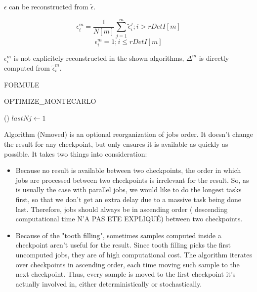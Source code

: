 \documentclass[./thesis.tex]{subfiles}
\begin{document}
$\epsilon$ can be reconstructed from $\tilde \epsilon$.



$$\epsilon^m_i = \frac{1}{N[m]} \sum_{j=1}^{m} {\tilde \epsilon^j_i} ; i > rDetI[m]$$
$$\epsilon^m_i = 1; i \leq rDetI[m]$$


$\epsilon^m_i$ is not explicitely reconstructed in the shown algorithms, $\Delta^m$ is directly computed from $\tilde \epsilon^m_i$.

FORMULE


\begin{algorithm}
	\caption{OPTIMIZE\_MONTECARLO}
	\label{OPTIMIZE_MONTECARLO}
	
	
	\Fn(){}{
		$lastNj \gets 1$ \;
	}
\end{algorithm}

Algorithm (Nmoved) is an optional reorganization of jobs order. It doesn't change the result for any checkpoint, but only ensures it is available as quickly as possible. It takes two things into consideration:
\begin{itemize}
\item
Because no result is available between two checkpoints, the order in which jobs are processed between two checkpoints is irrelevant for the result. So, as is usually the case with parallel jobs, we would like to do the longest tasks first, so that we don't get an extra delay due to a massive task being done last. Therefore, jobs should always be in ascending order ( descending computational time N'A PAS ETE EXPLIQUÉ) between two checkpoints.
\item
Because of the "tooth filling", sometimes samples computed inside a checkpoint aren't useful for the result. Since tooth filling picks the first uncomputed jobs, they are of high computational cost. The algorithm iterates over checkpoints in ascending order, each time moving such sample to the next checkpoint. Thus, every sample is moved to the first checkpoint it's actually involved in, either deterministically or stochastically.
\end{itemize}
\end{document}
